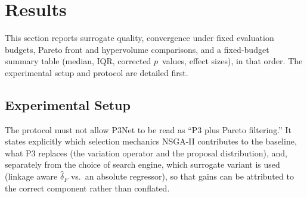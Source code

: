 \section{Results}
\label{sec:results}

This section reports surrogate quality, convergence under fixed evaluation budgets, Pareto front and
hypervolume comparisons, and a fixed-budget summary table (median, IQR, corrected $p$~values, effect sizes),
in that order. The experimental setup and protocol are detailed first.

\subsection*{Experimental Setup}

The protocol must not allow P3Net to be read as ``P3 plus Pareto filtering.'' It states explicitly which
selection mechanics NSGA-II contributes to the baseline, what P3 replaces (the variation operator and the
proposal distribution), and, separately from the choice of search engine, which surrogate variant is used
(linkage aware $\hat{\delta}_F$ vs.\ an absolute regressor), so that gains can be attributed to the correct
component rather than conflated.

